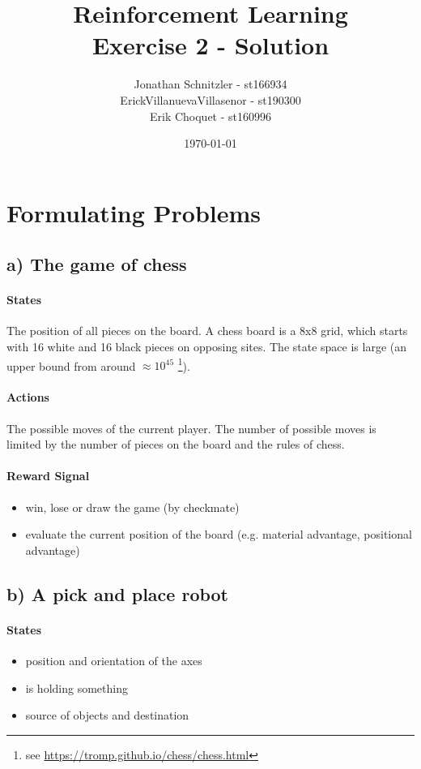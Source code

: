\documentclass{article}
\title{Reinforcement Learning \\ Exercise 2 - Solution}
\author{Jonathan Schnitzler - st166934 \\
ErickVillanuevaVillasenor - st190300 \\
Erik Choquet - st160996}
\date{\today}
\begin{document}
\maketitle




\section{Formulating Problems}

\subsection*{a) The game of chess}

\paragraph*{States}
The position of all pieces on the board. A chess board is a 8x8 grid, which starts with 16 white and 16 black pieces on opposing sites. The state space is large (an upper bound from around $\approx 10^{45}$ \footnote{see \url{https://tromp.github.io/chess/chess.html}}).

\paragraph*{Actions}
The possible moves of the current player. The number of possible moves is limited by the number of pieces on the board and the rules of chess.

\paragraph*{Reward Signal}
\begin{itemize}
    \item win, lose or draw the game (by checkmate)
    \item evaluate the current position of the board (e.g. material advantage, positional advantage)
\end{itemize}




\subsection*{b) A pick and place robot}

\paragraph*{States}
\begin{itemize}
    \item position and orientation of the axes
    \item is holding something
    \item source of objects and destination
\end{itemize}
\end{document}
